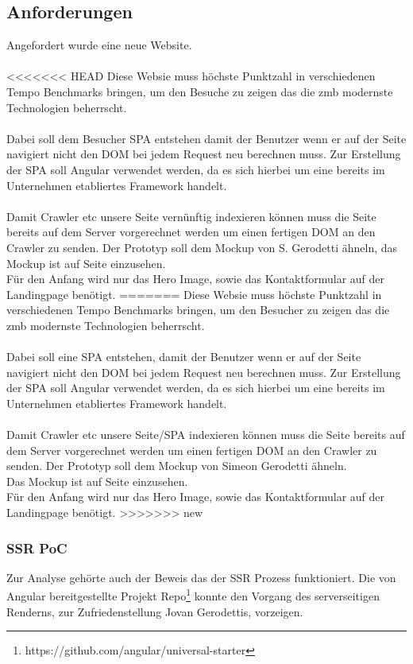 \documentclass[11pt,a4paper]{article}
\begin{document}
\subsection{Anforderungen}
Angefordert wurde eine neue Website.\\\\
<<<<<<< HEAD
Diese Websie muss höchste Punktzahl in verschiedenen Tempo Benchmarks bringen, um den Besuche zu zeigen das die zmb modernste Technologien beherrscht.\\\\
Dabei soll dem Besucher \acs{SPA} entstehen damit der Benutzer wenn er auf der Seite navigiert nicht den \acs{DOM} bei jedem Request neu berechnen muss.
Zur Erstellung der SPA soll Angular verwendet werden, da es sich hierbei um eine bereits im Unternehmen etabliertes Framework handelt.\\\\
Damit Crawler etc unsere Seite vernünftig indexieren können muss die Seite bereits auf dem Server vorgerechnet werden um einen fertigen \acs{DOM} an den Crawler zu senden.
Der Prototyp soll dem Mockup von S. Gerodetti ähneln, das Mockup ist auf Seite \pageref{tbl:Übersicht der Zeitplanung} einzusehen.\\Für den Anfang wird nur das Hero Image, sowie das Kontaktformular auf der Landingpage benötigt.
=======
Diese Websie muss höchste Punktzahl in verschiedenen Tempo Benchmarks bringen, um den Besucher zu zeigen das die zmb modernste Technologien beherrscht.\\\\
Dabei soll eine \acs{SPA} entstehen, damit der Benutzer wenn er auf der Seite navigiert nicht den \acs{DOM} bei jedem Request neu berechnen muss. 
Zur Erstellung der SPA soll Angular verwendet werden, da es sich hierbei um eine bereits im Unternehmen etabliertes Framework handelt.\\\\
Damit Crawler etc unsere Seite/SPA indexieren können muss die Seite bereits auf dem Server vorgerechnet werden um einen fertigen \acs{DOM} an den Crawler zu senden.
Der Prototyp soll dem Mockup von Simeon Gerodetti ähneln.\\ Das Mockup ist auf Seite \pageref{sec:mock} einzusehen.\\Für den Anfang wird nur das Hero Image, sowie das Kontaktformular auf der Landingpage benötigt. 
>>>>>>> new
\subsubsection{SSR PoC}
Zur Analyse gehörte auch der Beweis das der SSR Prozess funktioniert. Die von Angular bereitgestellte Projekt Repo\footnote{https://github.com/angular/universal-starter} konnte den Vorgang des serverseitigen Renderns, zur Zufriedenstellung Jovan Gerodettis, vorzeigen. 
\end{document}
